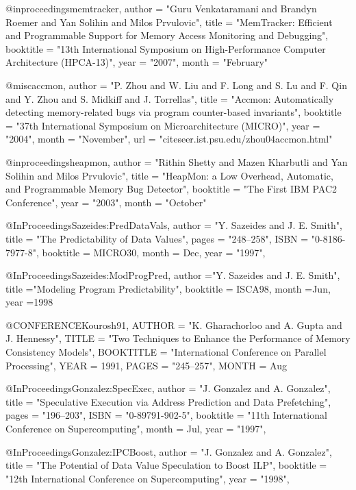 @inproceedings{memtracker,
  author = "{Guru Venkataramani and Brandyn Roemer and Yan Solihin and Milos Prvulovic}",
  title = "{MemTracker: Efficient and Programmable Support for Memory Access Monitoring and Debugging}",
  booktitle = "{13th International Symposium on High-Performance Computer Architecture (HPCA-13)}",
  year = "2007",
  month = "February"
}

@misc{accmon,
  author = "P. Zhou and W. Liu and F. Long and S. Lu and F. Qin and Y. Zhou and S.
    Midkiff and J. Torrellas",
  title = "{Accmon: Automatically detecting memory-related bugs via program counter-based
    invariants}",
  booktitle = "{37th International Symposium on Microarchitecture (MICRO)}",
  year = "2004",
  month = "November",
  url = "citeseer.ist.psu.edu/zhou04accmon.html" }


@inproceedings{heapmon,
  author = "{Rithin Shetty and Mazen Kharbutli and Yan Solihin and Milos Prvulovic}",
  title = "{HeapMon: a Low Overhead, Automatic, and Programmable Memory Bug Detector}",
  booktitle = "{The First IBM PAC2 Conference}",
  year = "2003",
  month = "October"
}

@InProceedings{Sazeides:PredDataVals,
  author =       "Y. Sazeides and J. E. Smith",
  title =        "The Predictability of Data Values",
  pages =        "248--258",
  ISBN =         "0-8186-7977-8",
  booktitle =    MICRO30,
  month =        Dec,
  year =         "1997",
}

@InProceedings{Sazeides:ModProgPred,
        author          ="Y. Sazeides and J. E. Smith",
        title           ="Modeling Program Predictability",
        booktitle       = ISCA98,
        month           =Jun,
        year            =1998
}

@CONFERENCE{Kourosh91,
	AUTHOR = "K. Gharachorloo and A. Gupta and J. Hennessy",
	TITLE = "Two Techniques to Enhance the Performance of Memory Consistency Models",
	BOOKTITLE = "International Conference on Parallel Processing",
	YEAR = 1991,
	PAGES = "245--257",
        MONTH = Aug
}

@InProceedings{Gonzalez:SpecExec,
  author =       "J. Gonzalez and A. Gonzalez",
  title =        "Speculative Execution via Address Prediction and Data
                 Prefetching",
  pages =        "196--203",
  ISBN =         "0-89791-902-5",
  booktitle =    "11th International Conference on
                 Supercomputing",
  month =        Jul,
  year =         "1997",
}

@InProceedings{Gonzalez:IPCBoost,
  author =       "J. Gonzalez and A. Gonzalez",
  title =        "The Potential of Data Value Speculation to Boost ILP",
  booktitle =    "12th International Conference on
                 Supercomputing",
  year =         "1998",
}


